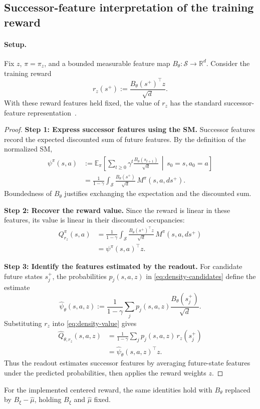 \subsection{Successor-feature interpretation of the training reward}
\label{app:reward-successor-features}

\paragraph{Setup.}
Fix $z$, $\pi=\pi_z$, and a bounded measurable feature map $B_\theta:\mathcal S\to\mathbb R^d$.
Consider the training reward
\[
    r_z(s^+):=\frac{B_\theta(s^+)^\top z}{\sqrt d}.
\]
With these reward features held fixed, the value of $r_z$ has the standard successor-feature representation~\citep{barreto-neurips17}.

\begin{proof}
\noindent\textbf{Step 1: Express successor features using the SM.}
Successor features record the expected discounted sum of future features.
By the definition of the normalized SM,
\[
\begin{aligned}
    \psi^\pi(s,a)
    &:=
    \mathbb E_\pi\!\left[
        \sum_{t\ge0}\gamma^t
        \frac{B_\theta(s_{t+1})}{\sqrt d}
        \,\middle|\,
        s_0=s,a_0=a
    \right]\\
    &=
    \frac{1}{1-\gamma}
    \int_{\mathcal S}
    \frac{B_\theta(s^+)}{\sqrt d}\,
    M^\pi(s,a,ds^+).
\end{aligned}
\]
Boundedness of $B_\theta$ justifies exchanging the expectation and the discounted sum.

\noindent\textbf{Step 2: Recover the reward value.}
Since the reward is linear in these features, its value is linear in their discounted occupancies:
\[
\begin{aligned}
    Q_{r_z}^\pi(s,a)
    &=
    \frac{1}{1-\gamma}
    \int_{\mathcal S}
    \frac{B_\theta(s^+)^\top z}{\sqrt d}\,
    M^\pi(s,a,ds^+)\\
    &=\psi^\pi(s,a)^\top z.
\end{aligned}
\]

\noindent\textbf{Step 3: Identify the features estimated by the readout.}
For candidate future states $s_j^+$, the probabilities $p_j(s,a,z)$ in \eqref{eq:density-candidates} define the estimate
\[
    \widehat\psi_\theta(s,a,z)
    :=
    \frac{1}{1-\gamma}
    \sum_j p_j(s,a,z)
    \frac{B_\theta(s_j^+)}{\sqrt d}.
\]
Substituting $r_z$ into \eqref{eq:density-value} gives
\[
\begin{aligned}
    \widehat Q_{\theta,r_z}(s,a,z)
    &=
    \frac{1}{1-\gamma}
    \sum_j p_j(s,a,z)\,r_z(s_j^+)\\
    &=\widehat\psi_\theta(s,a,z)^\top z.
\end{aligned}
\]
Thus the readout estimates successor features by averaging future-state features under the predicted probabilities, then applies the reward weights $z$.
\end{proof}

For the implemented centered reward, the same identities hold with $B_\theta$ replaced by $B_\xi-\hat\mu$, holding $B_\xi$ and $\hat\mu$ fixed.